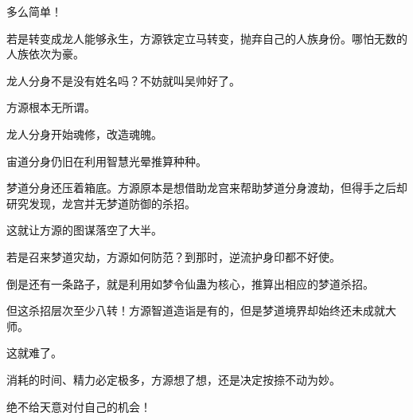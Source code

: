\begin{this_body}
多么简单！

若是转变成龙人能够永生，方源铁定立马转变，抛弃自己的人族身份。哪怕无数的人族依次为豪。

龙人分身不是没有姓名吗？不妨就叫吴帅好了。

方源根本无所谓。

龙人分身开始魂修，改造魂魄。

宙道分身仍旧在利用智慧光晕推算种种。

梦道分身还压着箱底。方源原本是想借助龙宫来帮助梦道分身渡劫，但得手之后却研究发现，龙宫并无梦道防御的杀招。

这就让方源的图谋落空了大半。

若是召来梦道灾劫，方源如何防范？到那时，逆流护身印都不好使。

倒是还有一条路子，就是利用如梦令仙蛊为核心，推算出相应的梦道杀招。

但这杀招层次至少八转！方源智道造诣是有的，但是梦道境界却始终还未成就大师。

这就难了。

消耗的时间、精力必定极多，方源想了想，还是决定按捺不动为妙。

绝不给天意对付自己的机会！

\end{this_body}

